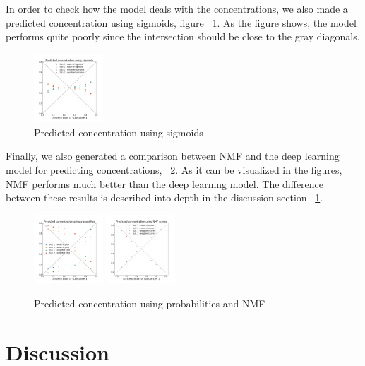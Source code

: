 \documentclass{article}
\begin{document}
In order to check how the model deals with the concentrations, we also made a predicted concentration using sigmoids, figure ~\ref{fig:conc_sigmoids}. As the figure shows, the model performs quite poorly since the intersection should be close to the gray diagonals.

\begin{figure}[!h]
	\includegraphics[width=0.23\textwidth]{figures_2/DNN_pred_conc_sigmoid.png} 
	\caption{Predicted concentration using sigmoids}
	\label{fig:conc_sigmoids}
\end{figure}

Finally, we also generated a comparison between NMF and the deep learning model for predicting concentrations, ~\ref{fig:comparison}. As it can be visualized in the figures, NMF performs much better than the deep learning model. The difference between these results is described into depth in the discussion section ~\ref{sec:discussion}.

\begin{figure}[!h]
	\includegraphics[width=0.23\textwidth]{figures_2/DNN_pred_conc_prob.png}
	\includegraphics[width=0.23\textwidth]{figures_2/nmf_pred_conc.png}
	\caption{Predicted concentration using probabilities and NMF}
	\label{fig:comparison}
\end{figure}


\section{Discussion}
\label{sec:discussion}
\end{document}
